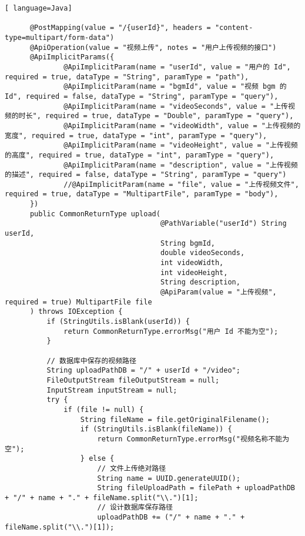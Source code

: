 \begin{lstlisting}[ language=Java]
  
      @PostMapping(value = "/{userId}", headers = "content-type=multipart/form-data")
      @ApiOperation(value = "视频上传", notes = "用户上传视频的接口")
      @ApiImplicitParams({
              @ApiImplicitParam(name = "userId", value = "用户的 Id", required = true, dataType = "String", paramType = "path"),
              @ApiImplicitParam(name = "bgmId", value = "视频 bgm 的 Id", required = false, dataType = "String", paramType = "query"),
              @ApiImplicitParam(name = "videoSeconds", value = "上传视频的时长", required = true, dataType = "Double", paramType = "query"),
              @ApiImplicitParam(name = "videoWidth", value = "上传视频的宽度", required = true, dataType = "int", paramType = "query"),
              @ApiImplicitParam(name = "videoHeight", value = "上传视频的高度", required = true, dataType = "int", paramType = "query"),
              @ApiImplicitParam(name = "description", value = "上传视频的描述", required = false, dataType = "String", paramType = "query")
              //@ApiImplicitParam(name = "file", value = "上传视频文件", required = true, dataType = "MultipartFile", paramType = "body"),
      })
      public CommonReturnType upload(
                                     @PathVariable("userId") String userId,
                                     String bgmId,
                                     double videoSeconds,
                                     int videoWidth,
                                     int videoHeight,
                                     String description,
                                     @ApiParam(value = "上传视频", required = true) MultipartFile file
      ) throws IOException {
          if (StringUtils.isBlank(userId)) {
              return CommonReturnType.errorMsg("用户 Id 不能为空");
          }
  
          // 数据库中保存的视频路径
          String uploadPathDB = "/" + userId + "/video";
          FileOutputStream fileOutputStream = null;
          InputStream inputStream = null;
          try {
              if (file != null) {
                  String fileName = file.getOriginalFilename();
                  if (StringUtils.isBlank(fileName)) {
                      return CommonReturnType.errorMsg("视频名称不能为空");
                  } else {
                      // 文件上传绝对路径
                      String name = UUID.generateUUID();
                      String fileUploadPath = filePath + uploadPathDB + "/" + name + "." + fileName.split("\\.")[1];
                      // 设计数据库保存路径
                      uploadPathDB += ("/" + name + "." + fileName.split("\\.")[1]);
  

\end{lstlisting}
